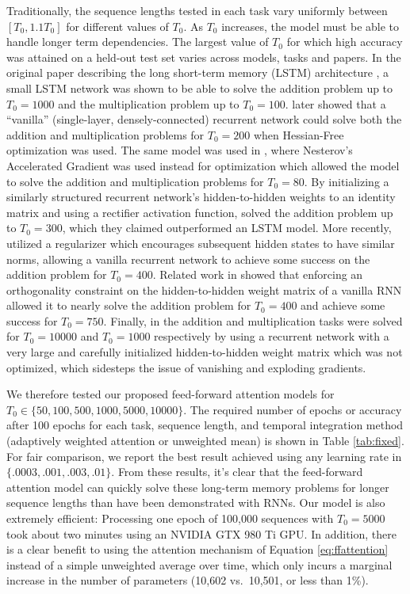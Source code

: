 \documentclass{article} %
\begin{document}
Traditionally, the sequence lengths tested in each task vary uniformly between $[T_0, 1.1T_0]$ for different values of $T_0$.
As $T_0$ increases, the model must be able to handle longer term dependencies.
The largest value of $T_0$ for which high accuracy was attained on a held-out test set varies across models, tasks and papers.
In the original paper describing the long short-term memory (LSTM) architecture \cite{hochreiter1997long}, a small LSTM network was shown to be able to solve the addition problem up to $T_0 = 1000$ and the multiplication problem up to $T_0 = 100$.
\cite{martens2011learning} later showed that a ``vanilla'' (single-layer, densely-connected) recurrent network could solve both the addition and multiplication problems for $T_0 = 200$ when Hessian-Free optimization was used.
The same model was used in \cite{sutskever2013importance}, where Nesterov's Accelerated Gradient was used instead for optimization which allowed the model to solve the addition and multiplication problems for $T_0 = 80$.
By initializing a similarly structured recurrent network's hidden-to-hidden weights to an identity matrix and using a rectifier activation function, \cite{le2015simple} solved the addition problem up to $T_0 = 300$, which they claimed outperformed an LSTM model.
More recently, \cite{krueger2015regularizing} utilized a regularizer which encourages subsequent hidden states to have similar norms, allowing a vanilla recurrent network to achieve some success on the addition problem for $T_0 = 400$.
Related work in \cite{arjovsky2015unitary} showed that enforcing an orthogonality constraint on the hidden-to-hidden weight matrix of a vanilla RNN allowed it to nearly solve the addition problem for $T_0 = 400$ and achieve some success for $T_0 = 750$.
Finally, in \cite{jaegar2012long} the addition and multiplication tasks were solved for $T_0 = 10000$ and $T_0 = 1000$ respectively by using a recurrent network with a very large and carefully initialized hidden-to-hidden weight matrix which was not optimized, which sidesteps the issue of vanishing and exploding gradients.

We therefore tested our proposed feed-forward attention models for $T_0 \in \{50, 100, 500, 1000, 5000, 10000\}$.
The required number of epochs or accuracy after 100 epochs for each task, sequence length, and temporal integration method (adaptively weighted attention or unweighted mean) is shown in Table \ref{tab:fixed}.
For fair comparison, we report the best result achieved using any learning rate in $\{.0003, .001, .003, .01\}$.
From these results, it's clear that the feed-forward attention model can quickly solve these long-term memory problems for longer sequence lengths than have been demonstrated with RNNs.
Our model is also extremely efficient: Processing one epoch of 100,000 sequences with $T_0 = 5000$ took about two minutes using an NVIDIA GTX 980 Ti GPU.
In addition, there is a clear benefit to using the attention mechanism of Equation \ref{eq:ffattention} instead of a simple unweighted average over time, which only incurs a marginal increase in the number of parameters (10,602 vs.\ 10,501, or less than 1\%).
\end{document}
